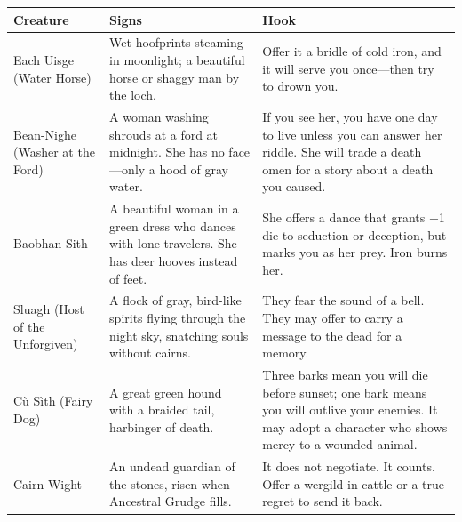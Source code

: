 \begin{longtable}{|p{}|p{}|p{}|}
\hline
\textbf{Creature} & \textbf{Signs} & \textbf{Hook} \\
\hline
Each Uisge (Water Horse) & Wet hoofprints steaming in moonlight; a beautiful horse or shaggy man by the loch. & Offer it a bridle of cold iron, and it will serve you once---then try to drown you. \\
\hline
Bean-Nighe (Washer at the Ford) & A woman washing shrouds at a ford at midnight. She has no face---only a hood of gray water. & If you see her, you have one day to live unless you can answer her riddle. She will trade a death omen for a story about a death you caused. \\
\hline
Baobhan Sith & A beautiful woman in a green dress who dances with lone travelers. She has deer hooves instead of feet. & She offers a dance that grants +1 die to seduction or deception, but marks you as her prey. Iron burns her. \\
\hline
Sluagh (Host of the Unforgiven) & A flock of gray, bird-like spirits flying through the night sky, snatching souls without cairns. & They fear the sound of a bell. They may offer to carry a message to the dead for a memory. \\
\hline
Cù Sìth (Fairy Dog) & A great green hound with a braided tail, harbinger of death. & Three barks mean you will die before sunset; one bark means you will outlive your enemies. It may adopt a character who shows mercy to a wounded animal. \\
\hline
Cairn-Wight & An undead guardian of the stones, risen when Ancestral Grudge fills. & It does not negotiate. It counts. Offer a wergild in cattle or a true regret to send it back. \\
\hline
\end{longtable}

